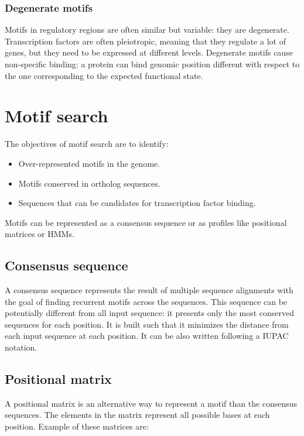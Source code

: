 	\subsubsection{Degenerate motifs}
	Motifs in regulatory regions are often similar but variable: they are degenerate.
	Transcription factors are often pleiotropic, meaning that they regulate a lot of genes, but they need to be expressed at different levels.
	Degenerate motifs cause non-specific binding: a protein can bind genomic position different with respect to the one corresponding to the expected functional state.

\section{Motif search}
The objectives of motif search are to identify:

\begin{multicols}{3}
	\begin{itemize}
		\item Over-represented motifs in the genome.
		\item Motifs conserved in ortholog sequences.
		\item Sequences that can be candidates for transcription factor binding.
	\end{itemize}
\end{multicols}

Motifs can be represented as a consensus sequence or as profiles like positional matrices or HMMs.

	\subsection{Consensus sequence}
	A consensus sequence represents the result of multiple sequence alignments with the goal of finding recurrent motifs across the sequences.
	This sequence can be potentially different from all input sequence: it presents only the most conserved sequences for each position.
	It is built such that it minimizes the distance from each input sequence at each position.
	It can be also written following a IUPAC notation.

	\subsection{Positional matrix}
	A positional matrix is an alternative way to represent a motif than the consensus sequences.
	The elements in the matrix represent all possible bases at each position.
	Example of these matrices are:

